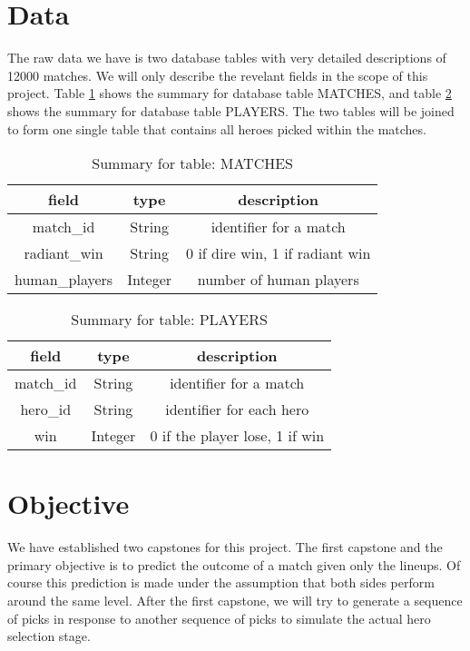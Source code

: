 \documentclass[11pt]{article}
\begin{document}
\section{Data}
The raw data we have is two database tables with very detailed descriptions of 12000 matches. We will only describe the revelant fields in the scope of this project. Table \ref{matches} shows the summary for database table MATCHES, and table \ref{players} shows the summary for database table PLAYERS. The two tables will be joined to form one single table that contains all heroes picked within the matches.

\begin{table}[h]
  \begin{center}
	\begin{tabular}{| c | c | c |}\hline
		field & type & description \\\hline
		match\_id & String & identifier for a match \\\hline
		radiant\_win & String & 0 if dire win, 1 if radiant win \\\hline
		human\_players & Integer & number of human players \\\hline
	\end{tabular}
	\caption{Summary for table: MATCHES}\label{matches}
  \end{center}
\end{table}

\begin{table}[h]
	\begin{center}
		\begin{tabular}{| c | c | c |}\hline
			field & type & description \\\hline
			match\_id & String & identifier for a match \\\hline
			hero\_id & String & identifier for each hero \\\hline
			win & Integer & 0 if the player lose, 1 if win \\\hline
		\end{tabular}
		\caption{Summary for table: PLAYERS}\label{players}
	\end{center}
\end{table}

\section{Objective}
We have established two capstones for this project. The first capstone and the primary objective is to predict the outcome of a match given only the lineups. Of course this prediction is made under the assumption that both sides perform around the same level. After the first capstone, we will try to generate a sequence of picks in response to another sequence of picks to simulate the actual hero selection stage.
\end{document}
